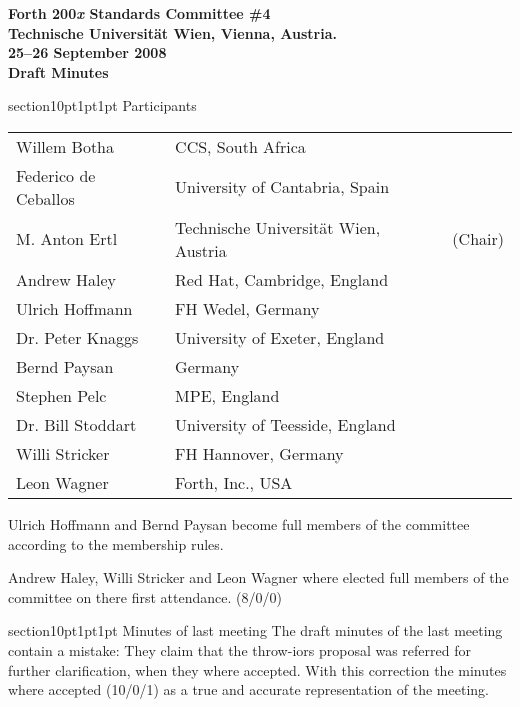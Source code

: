 \documentclass{article}
\makeatletter
\renewcommand{\section}{\@startsection
	{section}{1}{0pt}{1pt}{1pt}
	{\normalfont\bfseries}
}
\makeatother
\begin{document}
\pagestyle{empty}

\begin{center}\bf\large
Forth 200\emph{x} Standards Committee \#4 \\[6pt]
Technische Universit\"{a}t Wien, Vienna, Austria. \\[6pt]
25--26 September 2008 \\[12pt]
Draft Minutes
\end{center}

\section{Participants}
\label{members}

	\begin{tabular}{lll}
		Willem		Botha		& CCS, South Africa \\
		Federico de	Ceballos	& University of Cantabria, Spain \\
		M. Anton	Ertl		& Technische Universit\"{a}t Wien, Austria & (Chair) \\
		Andrew		Haley		& Red Hat, Cambridge, England \\
		Ulrich		Hoffmann	& FH Wedel, Germany	\\
		Dr. Peter	Knaggs		& University of Exeter, England \\
		Bernd		Paysan		& Germany \\
		Stephen		Pelc		& MPE, England \\
		Dr. Bill	Stoddart	& University of Teesside, England \\
		Willi		Stricker	& FH Hannover, Germany \\
		Leon		Wagner		& Forth, Inc., USA \\
	\end{tabular}

Ulrich Hoffmann and Bernd Paysan become full members of the
committee according to the membership rules.

Andrew Haley, Willi Stricker and Leon Wagner where elected
full members of the committee on there first attendance.
(8/0/0)

\section{Minutes of last meeting}
\label{minutes}
	The draft minutes of the last meeting contain a mistake:
	They claim that the \textsf{throw-iors} proposal was referred
	for further clarification, when they where accepted.  With
	this correction the minutes where accepted (10/0/1) as a true
	and accurate representation of the meeting.
\end{document}
